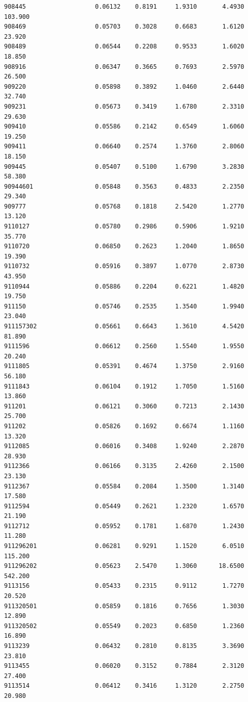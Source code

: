 \documentclass[
  letterpaper,
  DIV=11,
  numbers=noendperiod]{scrartcl}
\begin{document}
\begin{verbatim}
908445                   0.06132    0.8191     1.9310       4.4930 103.900
908469                   0.05703    0.3028     0.6683       1.6120  23.920
908489                   0.06544    0.2208     0.9533       1.6020  18.850
908916                   0.06347    0.3665     0.7693       2.5970  26.500
909220                   0.05898    0.3892     1.0460       2.6440  32.740
909231                   0.05673    0.3419     1.6780       2.3310  29.630
909410                   0.05586    0.2142     0.6549       1.6060  19.250
909411                   0.06640    0.2574     1.3760       2.8060  18.150
909445                   0.05407    0.5100     1.6790       3.2830  58.380
90944601                 0.05848    0.3563     0.4833       2.2350  29.340
909777                   0.05768    0.1818     2.5420       1.2770  13.120
9110127                  0.05780    0.2986     0.5906       1.9210  35.770
9110720                  0.06850    0.2623     1.2040       1.8650  19.390
9110732                  0.05916    0.3897     1.0770       2.8730  43.950
9110944                  0.05886    0.2204     0.6221       1.4820  19.750
911150                   0.05746    0.2535     1.3540       1.9940  23.040
911157302                0.05661    0.6643     1.3610       4.5420  81.890
9111596                  0.06612    0.2560     1.5540       1.9550  20.240
9111805                  0.05391    0.4674     1.3750       2.9160  56.180
9111843                  0.06104    0.1912     1.7050       1.5160  13.860
911201                   0.06121    0.3060     0.7213       2.1430  25.700
911202                   0.05826    0.1692     0.6674       1.1160  13.320
9112085                  0.06016    0.3408     1.9240       2.2870  28.930
9112366                  0.06166    0.3135     2.4260       2.1500  23.130
9112367                  0.05584    0.2084     1.3500       1.3140  17.580
9112594                  0.05449    0.2621     1.2320       1.6570  21.190
9112712                  0.05952    0.1781     1.6870       1.2430  11.280
911296201                0.06281    0.9291     1.1520       6.0510 115.200
911296202                0.05623    2.5470     1.3060      18.6500 542.200
9113156                  0.05433    0.2315     0.9112       1.7270  20.520
911320501                0.05859    0.1816     0.7656       1.3030  12.890
911320502                0.05549    0.2023     0.6850       1.2360  16.890
9113239                  0.06432    0.2810     0.8135       3.3690  23.810
9113455                  0.06020    0.3152     0.7884       2.3120  27.400
9113514                  0.06412    0.3416     1.3120       2.2750  20.980

\end{verbatim}
\end{document}

